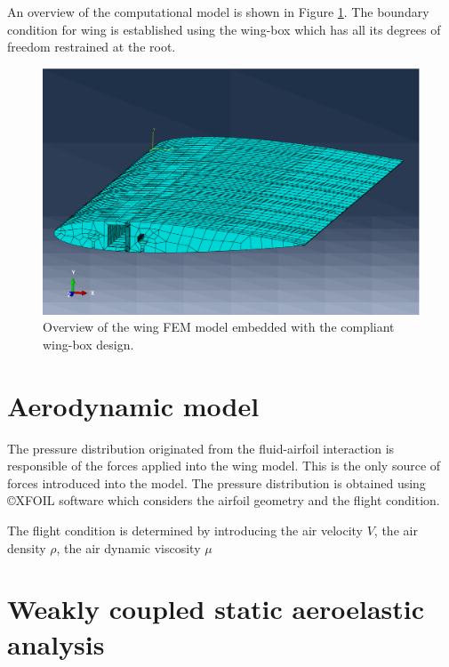     An overview of the computational model is shown in Figure \ref{fig:wing}. The boundary condition for wing is established using the wing-box which has all its degrees of freedom restrained at the root.

    \begin{figure}[!htpb]
      \centering
      \includegraphics[width=0.7 \textwidth]{figures/wing-model/wing}
      \caption[Overview of the wing FEM model embedded with the compliant wing-box design]{Overview of the wing FEM model embedded with the compliant wing-box design.}
      \label{fig:wing}
    \end{figure}

  \section{Aerodynamic model} \label{sec:aerodynamic_aeroelastic}

    The pressure distribution originated from the fluid-airfoil interaction is responsible of the forces applied into the wing model. This is the only source of forces introduced into the model. The pressure distribution is obtained using \copyright XFOIL software which considers the airfoil geometry and the flight condition.

    The flight condition is determined by introducing the air velocity $V$, the air density $\rho$, the air dynamic viscosity $\mu$

  \section{Weakly coupled static aeroelastic analysis} \label{sec:aeroelastic_aeroelastic}


